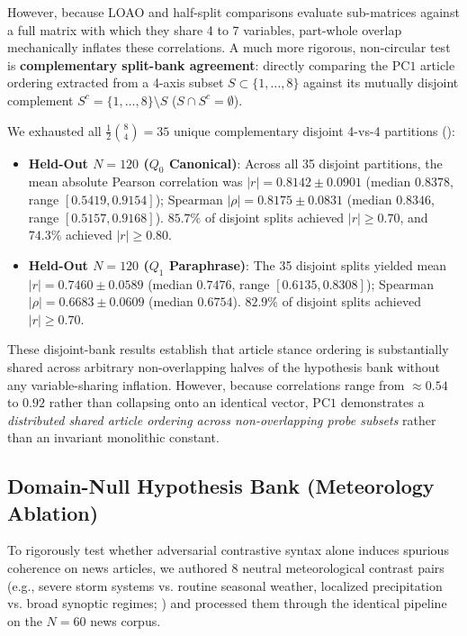 However, because LOAO and half-split comparisons evaluate sub-matrices against a full matrix with which they share 4 to 7 variables, part-whole overlap mechanically inflates these correlations. A much more rigorous, non-circular test is \textbf{complementary split-bank agreement}: directly comparing the $\mathrm{PC1}$ article ordering extracted from a 4-axis subset $S \subset \{1,\ldots,8\}$ against its mutually disjoint complement $S^c = \{1,\ldots,8\} \setminus S$ ($S \cap S^c = \emptyset$).

We exhausted all $\frac{1}{2}\binom{8}{4} = 35$ unique complementary disjoint 4-vs-4 partitions ():
\begin{itemize}
    \item \textbf{Held-Out $N=120$ ($Q_0$ Canonical)}: Across all 35 disjoint partitions, the mean absolute Pearson correlation was $|r| = 0.8142 \pm 0.0901$ (median $0.8378$, range $[0.5419, 0.9154]$); Spearman $|\rho| = 0.8175 \pm 0.0831$ (median $0.8346$, range $[0.5157, 0.9168]$). $85.7\%$ of disjoint splits achieved $|r| \geq 0.70$, and $74.3\%$ achieved $|r| \geq 0.80$.
    \item \textbf{Held-Out $N=120$ ($Q_1$ Paraphrase)}: The 35 disjoint splits yielded mean $|r| = 0.7460 \pm 0.0589$ (median $0.7476$, range $[0.6135, 0.8308]$); Spearman $|\rho| = 0.6683 \pm 0.0609$ (median $0.6754$). $82.9\%$ of disjoint splits achieved $|r| \geq 0.70$.
\end{itemize}
These disjoint-bank results establish that article stance ordering is substantially shared across arbitrary non-overlapping halves of the hypothesis bank without any variable-sharing inflation. However, because correlations range from $\approx 0.54$ to $0.92$ rather than collapsing onto an identical vector, $\mathrm{PC1}$ demonstrates a \emph{distributed shared article ordering across non-overlapping probe subsets} rather than an invariant monolithic constant.


\subsection{Domain-Null Hypothesis Bank (Meteorology Ablation)}
\label{sec:domain_null_results}

To rigorously test whether adversarial contrastive syntax alone induces spurious coherence on news articles, we authored 8 neutral meteorological contrast pairs (e.g., severe storm systems vs. routine seasonal weather, localized precipitation vs. broad synoptic regimes; ) and processed them through the identical pipeline on the $N=60$ news corpus.

